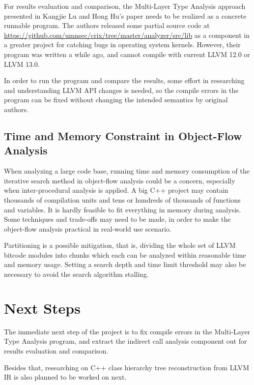 For results evaluation and comparison, the Multi-Layer Type Analysis approach presented in Kangjie Lu and Hong Hu's paper \cite{mlta} needs to be realized as a concrete runnable program. The authors released some partial source code at \url{https://github.com/umnsec/crix/tree/master/analyzer/src/lib} as a component in a greater project for catching bugs in operating system kernels. However, their program was written a while ago, and cannot compile with current LLVM 12.0 or LLVM 13.0.

In order to run the program and compare the results, some effort in researching and understanding LLVM API changes is needed, so the compile errors in the program can be fixed without changing the intended semantics by original authors.

\subsection*{Time and Memory Constraint in Object-Flow Analysis}

When analyzing a large code base, running time and memory consumption of the iterative search method in object-flow analysis could be a concern, especially when inter-procedural analysis is applied. A big C++ project may contain thousands of compilation units and tens or hundreds of thousands of functions and variables. It is hardly feasible to fit everything in memory during analysis. Some techniques and trade-offs may need to be made, in order to make the object-flow analysis practical in real-world use scenario.

Partitioning is a possible mitigation, that is, dividing the whole set of LLVM bitcode modules into chunks which each can be analyzed within reasonable time and memory usage. Setting a search depth and time limit threshold may also be necessary to avoid the search algorithm stalling.

\section{Next Steps}
\label{section:next-steps}

The immediate next step of the project is to fix compile errors in the Multi-Layer Type Analysis program, and extract the indirect call analysis component out for results evaluation and comparison.

Besides that, researching on C++ class hierarchy tree reconstruction from LLVM IR is also planned to be worked on next.



